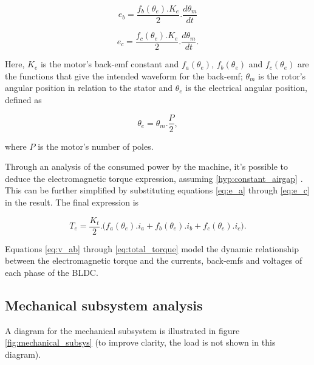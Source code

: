\documentclass{article}
\begin{document}
    \begin{equation}
        e_b = \frac{f_b(\theta_e).K_e}{2}.\frac{d\theta_m}{dt}
        \label{eq:e_b}
    \end{equation}

    \begin{equation}
        e_c = \frac{f_c(\theta_e).K_e}{2}.\frac{d\theta_m}{dt}.
        \label{eq:e_c}
    \end{equation}

    Here, $K_e$ is the motor's back-emf constant and $f_a(\theta_e)$, $f_b(\theta_e)$ and $f_c(\theta_e)$ are the functions that give the intended waveform for the back-emf; $\theta_m$ is the rotor's angular position in relation to the stator and $\theta_e$ is the electrical angular position, defined as

    \begin{equation}
        \theta_e = \theta_m.\frac{P}{2},
    \end{equation}

    where $P$ is the motor's number of poles.

    Through an analysis of the consumed power by the machine, it's possible to deduce the electromagnetic torque expression, assuming \ref{hyp:constant_airgap} \cite[p. 459]{ref:electrical_modeling}. This can be further simplified by substituting equations \ref{eq:e_a} through \ref{eq:e_c} in the result. The final expression is

    \begin{equation}
        T_e = \frac{K_t}{2}.\Big(f_a(\theta_e).i_a + f_b(\theta_e).i_b + f_c(\theta_e).i_c\Big).
        \label{eq:total_torque}
    \end{equation}

    Equations \ref{eq:v_ab} through \ref{eq:total_torque} model the dynamic relationship between the electromagnetic torque and the currents, back-emfs and voltages of each phase of the BLDC.




    \subsection{Mechanical subsystem analysis}

    A diagram for the mechanical subsystem is illustrated in figure \ref{fig:mechanical_subsys} (to improve clarity, the load is not shown in this diagram).
\end{document}
